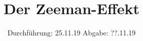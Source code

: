 

\subject{V27}
\title{Der Zeeman-Effekt}
\date{
  Durchführung: 25.11.19
  \hspace{3em}
  Abgabe: ??.11.19
}



\maketitle
\thispagestyle{empty}
\tableofcontents
\newpage




%



\newpage
\printbibliography


